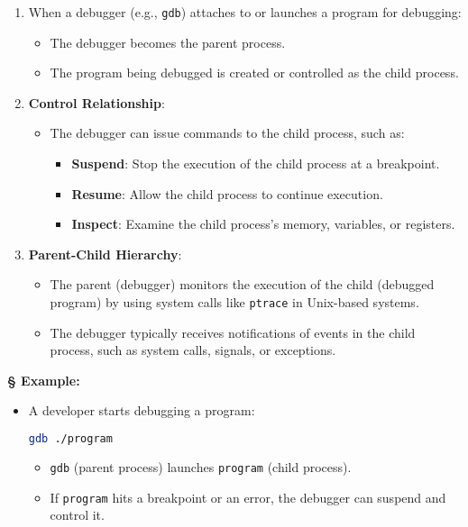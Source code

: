 \documentclass[a4paper]{book}
\newcommand{\sfbf}[1]{{\normalsize\textsf{\textbf{§ #1}}}}
\begin{document}
\begin{enumerate}
\item 
When a debugger (e.g., \verb|gdb|) attaches to or launches a program for debugging:
\begin{itemize}
\item 
The debugger becomes the parent process.

\item 
The program being debugged is created or controlled as the child process.

\end{itemize}

\item 
\textbf{Control Relationship}:
\begin{itemize}
\item 
The debugger can issue commands to the child process, such as:
\begin{itemize}
\item 
\textbf{Suspend}: Stop the execution of the child process at a breakpoint.

\item 
\textbf{Resume}: Allow the child process to continue execution.

\item 
\textbf{Inspect}: Examine the child process's memory, variables, or registers.

\end{itemize}

\end{itemize}

\item 
\textbf{Parent-Child Hierarchy}:
\begin{itemize}
\item 
The parent (debugger) monitors the execution of the child (debugged program) by using system calls like \verb|ptrace| in Unix-based systems.

\item 
The debugger typically receives notifications of events in the child process, such as system calls, signals, or exceptions.

\end{itemize}

\end{enumerate}

\sfbf{Example:}

\begin{itemize}
\item 
A developer starts debugging a program:

\begin{lstlisting}[language=bash]
gdb ./program
\end{lstlisting}

\begin{itemize}
\item 
\verb|gdb| (parent process) launches \verb|program| (child process).

\item 
If \verb|program| hits a breakpoint or an error, the debugger can suspend and control it.

\end{itemize}

\end{itemize}
\end{document}
